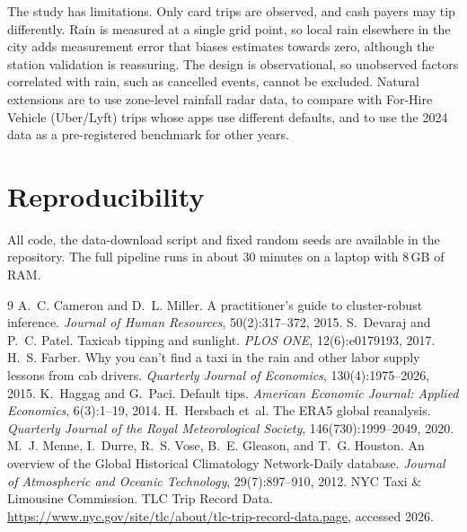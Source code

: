 \documentclass[11pt,a4paper]{article}
\begin{document}
The study has limitations. Only card trips are observed, and cash payers may tip differently. Rain is measured
at a single grid point, so local rain elsewhere in the city adds measurement error that biases estimates towards
zero, although the station validation is reassuring. The design is observational, so unobserved factors
correlated with rain, such as cancelled events, cannot be excluded. Natural extensions are to use zone-level
rainfall radar data, to compare with For-Hire Vehicle (Uber/Lyft) trips whose apps use different defaults, and
to use the 2024 data as a pre-registered benchmark for other years.

\section*{Reproducibility}
All code, the data-download script and fixed random seeds are available in the repository. The full pipeline
runs in about 30 minutes on a laptop with 8\,GB of RAM.

\begin{thebibliography}{9}
 A.~C. Cameron and D.~L. Miller. A practitioner's guide to cluster-robust inference.
  \emph{Journal of Human Resources}, 50(2):317--372, 2015.
 S.~Devaraj and P.~C. Patel. Taxicab tipping and sunlight. \emph{PLOS ONE},
  12(6):e0179193, 2017.
 H.~S. Farber. Why you can't find a taxi in the rain and other labor supply lessons from cab
  drivers. \emph{Quarterly Journal of Economics}, 130(4):1975--2026, 2015.
 K.~Haggag and G.~Paci. Default tips. \emph{American Economic Journal: Applied Economics},
  6(3):1--19, 2014.
 H.~Hersbach et~al. The ERA5 global reanalysis. \emph{Quarterly Journal of the Royal
  Meteorological Society}, 146(730):1999--2049, 2020.
 M.~J. Menne, I.~Durre, R.~S. Vose, B.~E. Gleason, and T.~G. Houston. An overview of the Global
  Historical Climatology Network-Daily database. \emph{Journal of Atmospheric and Oceanic Technology},
  29(7):897--910, 2012.
 NYC Taxi \& Limousine Commission. TLC Trip Record Data.
  \url{https://www.nyc.gov/site/tlc/about/tlc-trip-record-data.page}, accessed 2026.
\end{thebibliography}
\end{document}
